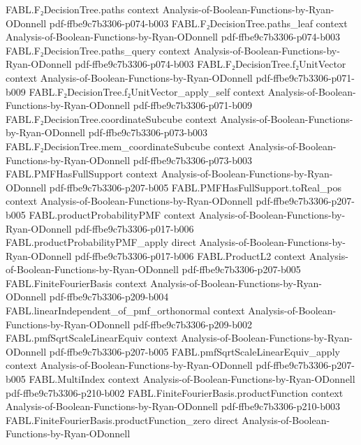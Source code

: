 \begin{theorem}
\proofstep
  {FABL.F₂DecisionTree.paths}
  {context}
  {Analysis-of-Boolean-Functions-by-Ryan-ODonnell}
  {pdf-ffbe9c7b3306-p074-b003}
\proofstep
  {FABL.F₂DecisionTree.paths_leaf}
  {context}
  {Analysis-of-Boolean-Functions-by-Ryan-ODonnell}
  {pdf-ffbe9c7b3306-p074-b003}
\proofstep
  {FABL.F₂DecisionTree.paths_query}
  {context}
  {Analysis-of-Boolean-Functions-by-Ryan-ODonnell}
  {pdf-ffbe9c7b3306-p074-b003}
\proofstep
  {FABL.F₂DecisionTree.f₂UnitVector}
  {context}
  {Analysis-of-Boolean-Functions-by-Ryan-ODonnell}
  {pdf-ffbe9c7b3306-p071-b009}
\proofstep
  {FABL.F₂DecisionTree.f₂UnitVector_apply_self}
  {context}
  {Analysis-of-Boolean-Functions-by-Ryan-ODonnell}
  {pdf-ffbe9c7b3306-p071-b009}
\proofstep
  {FABL.F₂DecisionTree.coordinateSubcube}
  {context}
  {Analysis-of-Boolean-Functions-by-Ryan-ODonnell}
  {pdf-ffbe9c7b3306-p073-b003}
\proofstep
  {FABL.F₂DecisionTree.mem_coordinateSubcube}
  {context}
  {Analysis-of-Boolean-Functions-by-Ryan-ODonnell}
  {pdf-ffbe9c7b3306-p073-b003}
\proofstep
  {FABL.PMFHasFullSupport}
  {context}
  {Analysis-of-Boolean-Functions-by-Ryan-ODonnell}
  {pdf-ffbe9c7b3306-p207-b005}
\proofstep
  {FABL.PMFHasFullSupport.toReal_pos}
  {context}
  {Analysis-of-Boolean-Functions-by-Ryan-ODonnell}
  {pdf-ffbe9c7b3306-p207-b005}
\proofstep
  {FABL.productProbabilityPMF}
  {context}
  {Analysis-of-Boolean-Functions-by-Ryan-ODonnell}
  {pdf-ffbe9c7b3306-p017-b006}
\proofstep
  {FABL.productProbabilityPMF_apply}
  {direct}
  {Analysis-of-Boolean-Functions-by-Ryan-ODonnell}
  {pdf-ffbe9c7b3306-p017-b006}
\proofstep
  {FABL.ProductL2}
  {context}
  {Analysis-of-Boolean-Functions-by-Ryan-ODonnell}
  {pdf-ffbe9c7b3306-p207-b005}
\proofstep
  {FABL.FiniteFourierBasis}
  {context}
  {Analysis-of-Boolean-Functions-by-Ryan-ODonnell}
  {pdf-ffbe9c7b3306-p209-b004}
\proofstep
  {FABL.linearIndependent_of_pmf_orthonormal}
  {context}
  {Analysis-of-Boolean-Functions-by-Ryan-ODonnell}
  {pdf-ffbe9c7b3306-p209-b002}
\proofstep
  {FABL.pmfSqrtScaleLinearEquiv}
  {context}
  {Analysis-of-Boolean-Functions-by-Ryan-ODonnell}
  {pdf-ffbe9c7b3306-p207-b005}
\proofstep
  {FABL.pmfSqrtScaleLinearEquiv_apply}
  {context}
  {Analysis-of-Boolean-Functions-by-Ryan-ODonnell}
  {pdf-ffbe9c7b3306-p207-b005}
\proofstep
  {FABL.MultiIndex}
  {context}
  {Analysis-of-Boolean-Functions-by-Ryan-ODonnell}
  {pdf-ffbe9c7b3306-p210-b002}
\proofstep
  {FABL.FiniteFourierBasis.productFunction}
  {context}
  {Analysis-of-Boolean-Functions-by-Ryan-ODonnell}
  {pdf-ffbe9c7b3306-p210-b003}
\proofstep
  {FABL.FiniteFourierBasis.productFunction_zero}
  {direct}
  {Analysis-of-Boolean-Functions-by-Ryan-ODonnell}

\end{theorem}

